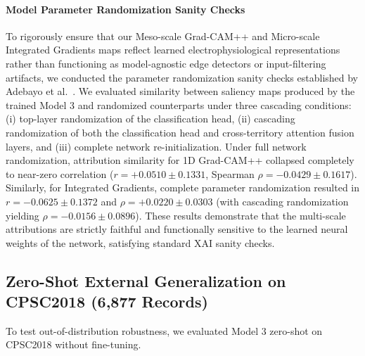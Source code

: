 \documentclass[5p,twocolumn,10pt]{elsarticle}
\begin{document}
\paragraph{Model Parameter Randomization Sanity Checks}
To rigorously ensure that our Meso-scale Grad-CAM++ and Micro-scale Integrated Gradients maps reflect learned electrophysiological representations rather than functioning as model-agnostic edge detectors or input-filtering artifacts, we conducted the parameter randomization sanity checks established by Adebayo et al.~\cite{adebayo2018sanity}. We evaluated similarity between saliency maps produced by the trained Model 3 and randomized counterparts under three cascading conditions: (i) top-layer randomization of the classification head, (ii) cascading randomization of both the classification head and cross-territory attention fusion layers, and (iii) complete network re-initialization. Under full network randomization, attribution similarity for 1D Grad-CAM++ collapsed completely to near-zero correlation ($r = +0.0510 \pm 0.1331$, Spearman $\rho = -0.0429 \pm 0.1617$). Similarly, for Integrated Gradients, complete parameter randomization resulted in $r = -0.0625 \pm 0.1372$ and $\rho = +0.0220 \pm 0.0303$ (with cascading randomization yielding $\rho = -0.0156 \pm 0.0896$). These results demonstrate that the multi-scale attributions are strictly faithful and functionally sensitive to the learned neural weights of the network, satisfying standard XAI sanity checks.

\subsection{Zero-Shot External Generalization on CPSC2018 (6,877 Records)}
To test out-of-distribution robustness, we evaluated Model 3 zero-shot on CPSC2018 without fine-tuning.

\begin{table}[t]
\caption{Zero-Shot Benchmark Results on CPSC2018 Dataset (6,877 Records).}
\label{tab:cpsc_zeroshot}
\centering
\small
\setlength{\tabcolsep}{3.5pt}
\end{table}
\end{document}

